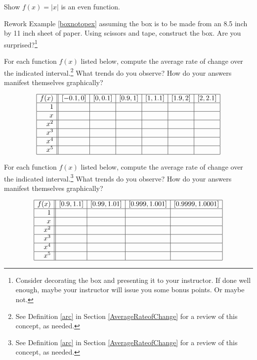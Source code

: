 \documentclass{ximera}
\begin{document}
\begin{problem}
Show $f(x) = |x|$ is an even function.
\end{problem}

\begin{problem}
Rework Example \ref{boxnotopex} assuming the box is to be made from an 8.5 inch by 11 inch sheet of paper. Using scissors and tape, construct the box.  Are you surprised?\footnote{Consider decorating the box and presenting it to your instructor. If done well enough, maybe your instructor will issue you some bonus points.  Or maybe not.}
\end{problem}

\begin{problem}
For each function $f(x)$ listed below, compute the average rate of change over the indicated interval.\footnote{See Definition \ref{arc} in Section \ref{AverageRateofChange} for a review of this concept, as needed.}  What trends do you observe?  How do your answers manifest themselves graphically?

\[ \begin{array}{|r||c|c|c|c|c|c|}  \hline

 f(x) &  [-0.1, 0] & [0, 0.1] &[0.9, 1] & [1, 1.1] & [1.9, 2] & [2, 2.1]  \\ \hline
 1 &&&&&& \\  \hline
 x  &&&&&& \\  \hline
 x^2 &&&&&&  \\  \hline
 x^3 &&&&&& \\  \hline
 x^4 &&&&&& \\ \hline
 x^5 &&&&&& \\ \hline

\end{array} \]

\end{problem}


\begin{problem}\label{monomialarcexercise}
    For each function $f(x)$ listed below, compute the average rate of change over the indicated interval.\footnote{See Definition \ref{arc} in Section \ref{AverageRateofChange} for a review of this concept, as needed.}  What trends do you observe?  How do your answers manifest themselves graphically?

\[ \begin{array}{|r||c|c|c|c|}  \hline

 f(x) &  [0.9, 1.1] & [0.99, 1.01] &[0.999, 1.001] & [0.9999, 1.0001]  \\ \hline
 1 &&&&   \\  \hline
 x &&&&    \\  \hline
 x^2 &&&&   \\  \hline
 x^3 &&&&   \\  \hline
 x^4 &&&&  \\ \hline
 x^5 &&&&  \\ \hline

\end{array} \]

\end{problem}
 
\end{document}
